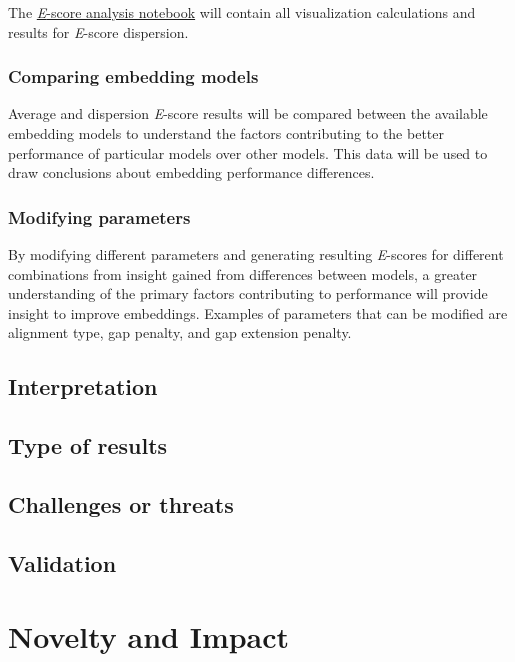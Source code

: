 \documentclass[
	letterpaper, %
	10pt, %
]{LTJournalArticle}
\begin{document}
The \href{https://github.com/rgavigan/e-score}{\textit{E}-score analysis notebook} will contain all visualization calculations and results for \textit{E}-score dispersion.

\subsubsection{Comparing embedding models}

Average and dispersion \textit{E}-score results will be compared between the available embedding models to understand the factors contributing to the better performance of particular models over other models. This data will be used to draw conclusions about embedding performance differences.

\subsubsection{Modifying parameters}

By modifying different parameters and generating resulting \textit{E}-scores for different combinations from insight gained from differences between models, a greater understanding of the primary factors contributing to performance will provide insight to improve embeddings. Examples of parameters that can be modified are alignment type, gap penalty, and gap extension penalty.

\subsection{Interpretation}

\subsection{Type of results}

\subsection{Challenges or threats}

\subsection{Validation}

\section{Novelty and Impact}
\end{document}

